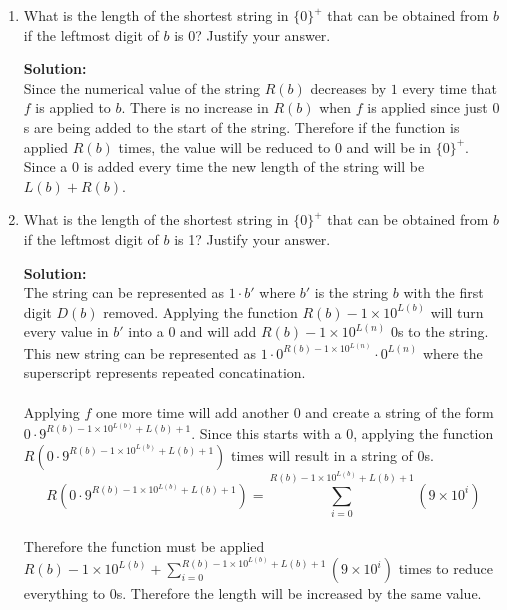 \documentclass[11pt]{article}
\begin{document}
\begin{enumerate}
\item
\begin{question}
What is the length of the shortest string in $\{0\}^+$ that can be obtained from $b$ if the leftmost digit of $b$ is 0? Justify your answer.
\end{question}

\begin{solution}
{\bf Solution:}\\
Since the numerical value of the string $R(b)$ decreases by $1$ every time that $f$ is applied to $b$. There is no increase in $R(b)$ when $f$ is applied since just $0$s are being added to the start of the string. Therefore if the function is applied $R(b)$ times, the value will be reduced to $0$ and will be in $\{0\}^+$. Since a $0$ is added every time the new length of the string will be $L(b) + R(b)$.
\end{solution}

\item
\begin{question}
What is the length of the shortest string in $\{0\}^+$ that can be obtained from $b$ if the leftmost digit of $b$ is 1? Justify your answer.
\end{question}

\begin{solution}
{\bf Solution:}\\
The string can be represented as $1\cdot b'$ where $b'$ is the string $b$ with the first digit $D(b)$ removed. Applying the function $R(b) - 1\times 10^{L(b)}$ will turn every value in $b'$ into a $0$ and will add $R(b) - 1\times 10^{L(n)}$ $0$s to the string. This new string can be represented as $1\cdot 0^{R(b)-1\times10^{L(n)}}\cdot0^{L(n)}$ where the superscript represents repeated concatination. \\\\
Applying $f$ one more time will add another $0$ and create a string of the form $0\cdot 9^{R(b) - 1\times 10^{L(b)} + L(b) + 1}$. Since this starts with a $0$, applying the function $R(0\cdot 9^{R(b) - 1\times 10^{L(b)} + L(b) + 1})$ times will result in a string of $0$s.
$$R(0\cdot 9^{R(b) - 1\times 10^{L(b)} + L(b) + 1}) = \sum _{i=0}^{R(b) - 1\times 10^{L(b)} + L(b) + 1}(9\times10^i)$$\\
Therefore the function must be applied $ R(b)-1\times10^{L(b)} +  \sum _{i=0}^{R(b) - 1\times 10^{L(b)} + L(b) + 1}(9\times10^i)$ times to reduce everything to $0$s. Therefore the length will be increased by the same value.
\end{solution}


\end{enumerate}
\end{document}
